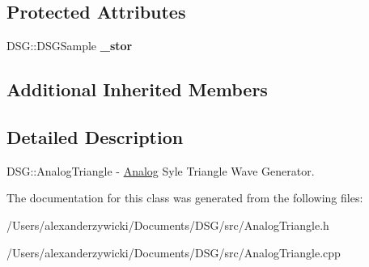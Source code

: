 \subsection*{Protected Attributes}
\begin{DoxyCompactItemize}
\item 
\hypertarget{class_d_s_g_1_1_analog_1_1_analog_triangle_ac93bccb7e366491f45ea9c3af04072ae}{D\+S\+G\+::\+D\+S\+G\+Sample {\bfseries \+\_\+stor}}\label{class_d_s_g_1_1_analog_1_1_analog_triangle_ac93bccb7e366491f45ea9c3af04072ae}

\end{DoxyCompactItemize}
\subsection*{Additional Inherited Members}


\subsection{Detailed Description}
D\+S\+G\+::\+Analog\+Triangle -\/ \hyperlink{namespace_d_s_g_1_1_analog}{Analog} Syle Triangle Wave Generator. 

The documentation for this class was generated from the following files\+:\begin{DoxyCompactItemize}
\item 
/\+Users/alexanderzywicki/\+Documents/\+D\+S\+G/src/Analog\+Triangle.\+h\item 
/\+Users/alexanderzywicki/\+Documents/\+D\+S\+G/src/Analog\+Triangle.\+cpp\end{DoxyCompactItemize}
